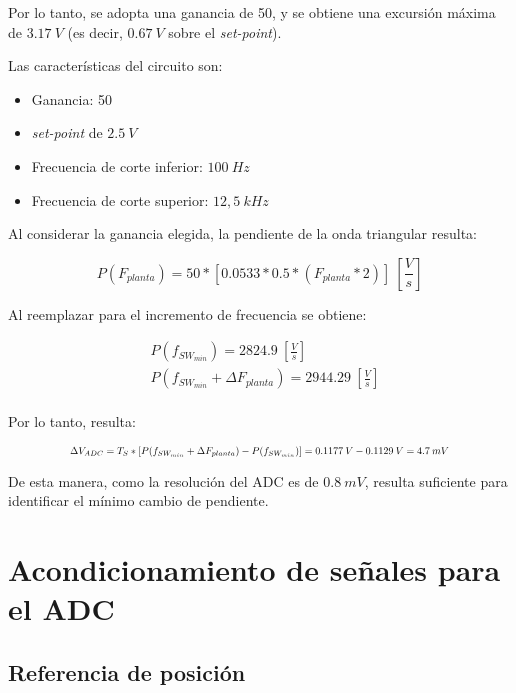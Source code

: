 \noindent Por lo tanto, se adopta una ganancia de 50, y se obtiene una excursión máxima de $3.17\:V$ (es decir, $0.67\:V$ sobre el \textsl{set-point}).


\noindent Las características del circuito son:

\begin{itemize}
	\item Ganancia: 50
	\item \textsl{set-point} de $2.5\:V$
	\item Frecuencia de corte inferior: $100\:Hz$
	\item Frecuencia de corte superior: $12,5\:kHz$
\end{itemize}

\noindent Al considerar la ganancia elegida,  la pendiente de la onda triangular resulta:

\begin{equation} 
	P(F_{planta}) = 50 * [0.0533 * 0.5 * (F_{planta}*2)]\:[\frac{V}{s}]
\end{equation}

\noindent Al reemplazar para el incremento de frecuencia se obtiene: 

\begin{equation} 
	\begin{aligned}
		&P(f_{SW_{min}}) = 2824.9 \: [\frac{V}{s}]\\
		&P(f_{SW_{min}} + \Delta F_{planta}) = 2944.29 \: [\frac{V}{s}]\\		 
	\end{aligned}
\end{equation}

\noindent Por lo tanto, resulta:


\begin{equation} 
	\resizebox{.8\hsize}{!}
	{
	$\Delta V_{ADC} = T_S * [P(f_{SW_{min}} + \Delta F_{planta}) - P(f_{SW_{min}})] = 0.1177\:V - 0.1129\:V = 4.7\:mV$
	}
\end{equation}


\noindent De esta manera, como la resolución del ADC es de $0.8\:mV$, resulta suficiente para identificar el mínimo cambio de pendiente.


\section{Acondicionamiento de señales para el ADC}

\subsection{Referencia de posición}

